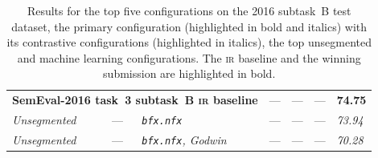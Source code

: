 \documentclass[
  digital, %
  notable, %
  lof,     %
  lot,     %
  nopalatino, color
]{fithesis3}
\newenvironment{liningfigs}{\renewcommand*{\rmdefault}{zpltlf}\normalfont}{}
\def\abbr#1{\textsc{\MakeLowercase{#1}}}
\begin{document}
\begin{table}
\begin{liningfigs}
\begin{tabular}{lllllll}
\multicolumn{3}{l}{\bfseries SemEval-2016 task~3 subtask~B \abbr{IR}\index{ir@\protect\abbr{IR}} baseline} &
  --- &
  --- &
  --- &
  \bfseries74.75 \\
\itshape Unsegmented &
  --- &
  \itshape\texttt{bfx.nfx} &
  --- &
  --- &
  --- &
  \itshape73.94 \\
\itshape Unsegmented &
  --- &
  \itshape\texttt{bfx.nfx}, Godwin &
  --- &
  --- &
  --- &
  \itshape70.28 \\
\end{tabular}
\end{liningfigs}
\caption[Results for the top five configurations on the 2016
subtask~B test dataset]{%
  Results for the top five configurations on the 2016
  subtask~B test dataset, the primary configuration (highlighted in bold
  and italics) with its contrastive configurations (highlighted in italics),
  the top unsegmented and machine learning configurations. The
  \abbr{IR} baseline and the winning submission are highlighted in
  bold.}
\label{tab:segmentation-results-2016}
\end{table}
\end{document}
